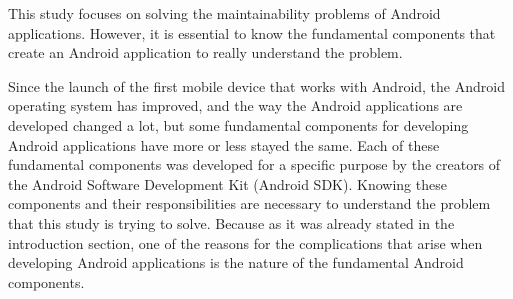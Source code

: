This study focuses on solving the maintainability problems of Android applications. However, it is essential to know the fundamental components that create an Android application to really understand the problem.

Since the launch of the first mobile device that works with Android,  the Android operating system has improved, and the way the Android applications are developed changed a lot, but some fundamental components for developing Android applications have more or less stayed the same. Each of these fundamental components was developed for a specific purpose by the creators of the Android Software Development Kit (Android SDK). Knowing these components and their responsibilities are necessary to understand the problem that this study is trying to solve. Because as it was already stated in the introduction section, one of the reasons for the complications that arise when developing Android applications is the nature of the fundamental Android components.


